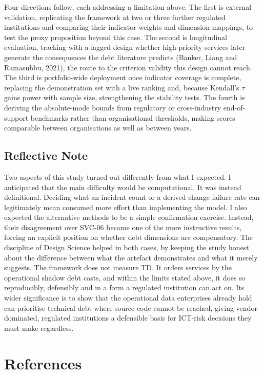 \documentclass[
  12pt,
  letterpaper,
  12pt,
  oneside,
  english,
  onehalfspacing,
  headsepline]{MastersDoctoralThesis}
\begin{document}
Four directions follow, each addressing a limitation above. The first is
external validation, replicating the framework at two or three further
regulated institutions and comparing their indicator weights and
dimension mappings, to test the proxy proposition beyond this case. The
second is longitudinal evaluation, tracking with a lagged design whether
high-priority services later generate the consequences the debt
literature predicts (Banker, Liang and Ramasubbu, 2021), the route to
the criterion validity this design cannot reach. The third is
portfolio-wide deployment once indicator coverage is complete, replacing
the demonstration set with a live ranking and, because Kendall's
\(\tau\) gains power with sample size, strengthening the stability
tests. The fourth is deriving the absolute-mode bounds from regulatory
or cross-industry end-of-support benchmarks rather than organisational
thresholds, making scores comparable between organisations as well as
between years.

\section{Reflective Note}\label{reflective-note}

Two aspects of this study turned out differently from what I expected. I
anticipated that the main difficulty would be computational. It was
instead definitional. Deciding what an incident count or a derived
change failure rate can legitimately mean consumed more effort than
implementing the model. I also expected the alternative methods to be a
simple confirmation exercise. Instead, their disagreement over SVC-06
became one of the more instructive results, forcing an explicit position
on whether debt dimensions are compensatory. The discipline of Design
Science helped in both cases, by keeping the study honest about the
difference between what the artefact demonstrates and what it merely
suggests. The framework does not measure TD. It orders services by the
operational shadow debt casts, and within the limits stated above, it
does so reproducibly, defensibly and in a form a regulated institution
can act on. Its wider significance is to show that the operational data
enterprises already hold can prioritise technical debt where source code
cannot be reached, giving vendor-dominated, regulated institutions a
defensible basis for ICT-risk decisions they must make regardless.


\chapter*{References}\label{references}
\end{document}
